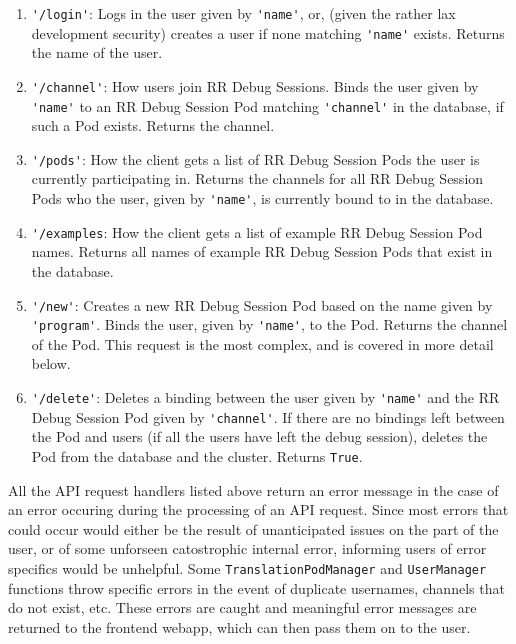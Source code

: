 \documentclass[12pt]{article}
\begin{document}
\begin{enumerate}
\item \lstinline{'/login'}: Logs in the user given by
  \lstinline{'name'}, or, (given the rather lax development security)
  creates a user if none matching \lstinline{'name'} exists.  Returns
  the name of the user.
\item \lstinline{'/channel'}: How users join RR Debug Sessions.  Binds
  the user given by \lstinline{'name'} to an RR Debug Session Pod
  matching \lstinline{'channel'} in the database, if such a Pod
  exists.  Returns the channel.
\item \lstinline{'/pods'}: How the client gets a list of RR Debug
  Session Pods the user is currently participating in.  Returns the
  channels for all RR Debug Session Pods who the user, given by
  \lstinline{'name'}, is currently bound to in the database.
\item \lstinline{'/examples}: How the client gets a list of example RR
  Debug Session Pod names.  Returns all names of example RR Debug
  Session Pods that exist in the database.
\item \lstinline{'/new'}: Creates a new RR Debug Session Pod based on
  the name given by \lstinline{'program'}.  Binds the user, given by
  \lstinline{'name'}, to the Pod.  Returns the channel of the Pod.
  This request is the most complex, and is covered in more detail
  below.
\item \lstinline{'/delete'}: Deletes a binding between the user given
  by \lstinline{'name'} and the RR Debug Session Pod given by
  \lstinline{'channel'}.  If there are no bindings left between the
  Pod and users (if all the users have left the debug session),
  deletes the Pod from the database and the cluster.  Returns
  \lstinline{True}.
\end{enumerate}

All the API request handlers listed above return an error message in
the case of an error occuring during the processing of an API request.
Since most errors that could occur would either be the result of
unanticipated issues on the part of the user, or of some unforseen
catostrophic internal error, informing users of error specifics would
be unhelpful.  Some \lstinline{TranslationPodManager} and
\lstinline{UserManager} functions throw specific errors in the event
of duplicate usernames, channels that do not exist, etc.  These errors
are caught and meaningful error messages are returned to the frontend
webapp, which can then pass them on to the user.
\par
\end{document}
